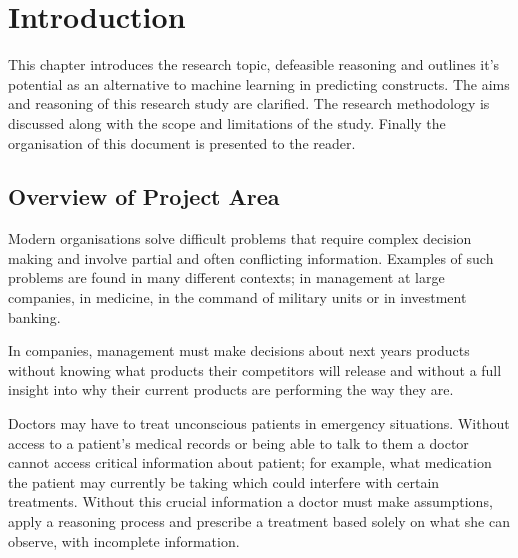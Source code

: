 
\chapter{Introduction} %

\label{Chapter1} %



This chapter introduces the research topic, defeasible reasoning and outlines it's potential as an alternative to machine learning in predicting constructs. The aims and reasoning of this research study are clarified. The research methodology is discussed along with the scope and limitations of the study. Finally the organisation of this document is presented to the reader.


\section{Overview of Project Area}

Modern organisations solve difficult problems that require complex decision making and involve partial and often conflicting information. Examples of such problems are found in many different contexts; in management at large companies, in medicine, in the command of military units or in investment banking.

In companies, management must make decisions about next years products without knowing what products their competitors will release and without a full insight into why their current products are performing the way they are.

Doctors may have to treat unconscious patients in emergency situations. Without access to a patient’s medical records or being able to talk to them a doctor cannot access critical information about patient; for example, what medication the patient may currently be taking which could interfere with certain treatments. Without this crucial information a doctor must make assumptions, apply a reasoning process and prescribe a treatment based solely on what she can observe, with incomplete information.

